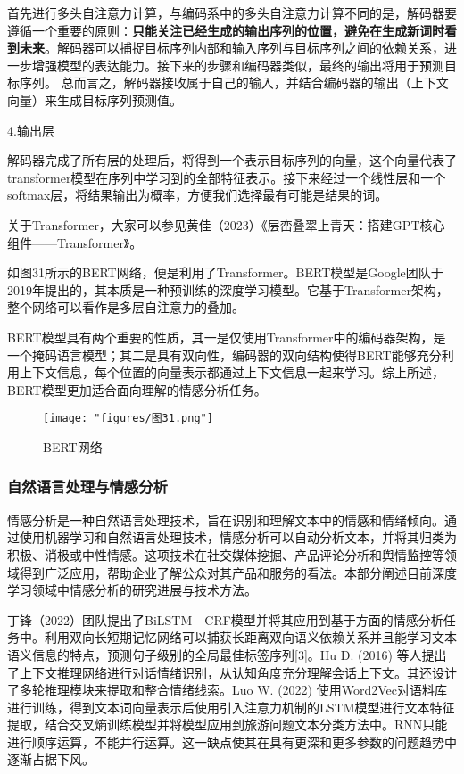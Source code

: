 首先进行多头自注意力计算，与编码系中的多头自注意力计算不同的是，解码器要遵循一个重要的原则：\textbf{只能关注已经生成的输出序列的位置，避免在生成新词时看到未来}。解码器可以捕捉目标序列内部和输入序列与目标序列之间的依赖关系，进一步增强模型的表达能力。接下来的步骤和编码器类似，最终的输出将用于预测目标序列。
总而言之，解码器接收属于自己的输入，并结合编码器的输出（上下文向量）来生成目标序列预测值。

4.输出层

解码器完成了所有层的处理后，将得到一个表示目标序列的向量，这个向量代表了transformer模型在序列中学习到的全部特征表示。接下来经过一个线性层和一个softmax层，将结果输出为概率，方便我们选择最有可能是结果的词。

关于Transformer，大家可以参见黄佳（2023）《层峦叠翠上青天：搭建GPT核心组件——Transformer》。

如图31所示的BERT网络，便是利用了Transformer。BERT模型是Google团队于2019年提出的，其本质是一种预训练的深度学习模型。它基于Transformer架构，整个网络可以看作是多层自注意力的叠加。

BERT模型具有两个重要的性质，其一是仅使用Transformer中的编码器架构，是一个掩码语言模型；其二是具有双向性，编码器的双向结构使得BERT能够充分利用上下文信息，每个位置的向量表示都通过上下文信息一起来学习。综上所述，BERT模型更加适合面向理解的情感分析任务。
\begin{figure}[ht] %
	\centering
	\texttt{[image: "figures/图31.png"]} %
	\caption{BERT网络} %
	\label{fig:example} %
\end{figure}

\subsubsection{自然语言处理与情感分析}
情感分析是一种自然语言处理技术，旨在识别和理解文本中的情感和情绪倾向。通过使用机器学习和自然语言处理技术，情感分析可以自动分析文本，并将其归类为积极、消极或中性情感。这项技术在社交媒体挖掘、产品评论分析和舆情监控等领域得到广泛应用，帮助企业了解公众对其产品和服务的看法。本部分阐述目前深度学习领域中情感分析的研究进展与技术方法。

丁锋（2022）团队提出了BiLSTM - CRF模型并将其应用到基于方面的情感分析任务中。利用双向长短期记忆网络可以捕获长距离双向语义依赖关系并且能学习文本语义信息的特点，预测句子级别的全局最佳标签序列[3]。Hu D. (2016) 等人提出了上下文推理网络进行对话情绪识别，从认知角度充分理解会话上下文。其还设计了多轮推理模块来提取和整合情绪线索。Luo W. (2022) 使用Word2Vec对语料库进行训练，得到文本词向量表示后使用引入注意力机制的LSTM模型进行文本特征提取，结合交叉熵训练模型并将模型应用到旅游问题文本分类方法中。RNN只能进行顺序运算，不能并行运算。这一缺点使其在具有更深和更多参数的问题趋势中逐渐占据下风。


